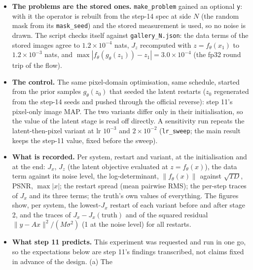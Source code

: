 \documentclass[11pt]{article}
\begin{document}
\begin{itemize}
        latent ones. The schedule is step 11's image-MAP one: lr $5 \times
        10^{-3}$, cosine to zero, 1000 steps, betas $(0.9, 0.999)$,
        non-finite gradients zeroed and counted (none occurred). All 18 rows
        run as one batch (independent objectives, elementwise optimiser).
  \item \textbf{The problems are the stored ones.} \texttt{make\_problem}
        gained an optional \texttt{y}: with it the operator is rebuilt from
        the step-14 spec at side $N$ (the random mask from its
        \texttt{mask\_seed}) and the stored measurement is used, so no noise
        is drawn. The script checks itself against
        \texttt{gallery\_N.json}: the data terms of the stored images agree
        to $1.2 \times 10^{-4}$ nats, $J_z$ recomputed with $z = f_\theta(x_1)$
        to $1.2 \times 10^{-3}$ nats, and $\max|f_\theta(g_\theta(z_1)) -
        z_1| = 3.0 \times 10^{-4}$ (the fp32 round trip of the flow).
  \item \textbf{The control.} The same pixel-domain optimisation, same
        schedule, started from the prior samples $g_\theta(z_0)$ that seeded
        the latent restarts ($z_0$ regenerated from the step-14 seeds and
        pushed through the official reverse): step 11's pixel-only image
        MAP. The two variants differ only in their initialisation, so the
        value of the latent stage is read off directly. A sensitivity run
        repeats the latent-then-pixel variant at lr $10^{-3}$ and $2 \times
        10^{-2}$ (\texttt{lr\_sweep}; the main result keeps the step-11
        value, fixed before the sweep).
  \item \textbf{What is recorded.} Per system, restart and variant, at the
        initialisation and at the end: $J_x$, $J_z$ (the latent objective
        evaluated at $z = f_\theta(x)$), the data term against its noise
        level, the log-determinant, $\|f_\theta(x)\|$ against $\sqrt{TD}$,
        PSNR, $\max|x|$; the restart spread (mean pairwise RMS); the
        per-step traces of $J_x$ and its three terms; the truth's own
        values of everything. The figures show, per system, the
        lowest-$J_x$ restart of each variant before and after stage 2, and
        the traces of $J_x - J_x(\text{truth})$ and of the squared residual
        $\|y - Ax\|^2/(M\sigma^2)$ (1 at the noise level) for all restarts.
  \item \textbf{What step 11 predicts.} This experiment was requested and
        run in one go, so the expectations below are step 11's findings
        transcribed, not claims fixed in advance of the design. (a) The

\end{itemize}
\end{document}
